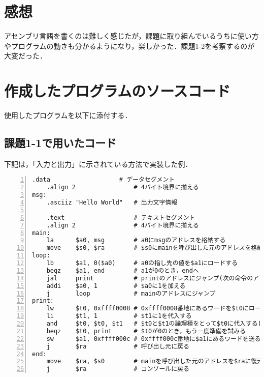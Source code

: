 \section{感想}
アセンブリ言語を書くのは難しく感じたが，課題に取り組んでいるうちに使い方やプログラムの動きも分かるようになり，楽しかった．課題1-2を考察するのが大変だった．

\section{作成したプログラムのソースコード} \label{sec:makep}

使用したプログラムを以下に添付する．



\subsection{課題1-1で用いたコード} \label{sec:p1-1}
下記は，「入力と出力」に示されている方法で実装した例．
\begin{Verbatim}[numbers=left, xleftmargin=10mm, numbersep=6pt,
                    fontsize=\small, baselinestretch=0.8]
    .data                   # データセグメント
    .align 2                # 4バイト境界に揃える
msg:
    .asciiz "Hello World"   # 出力文字情報

    .text                   # テキストセグメント
    .align 2                # 4バイト境界に揃える
main:
    la      $a0, msg        # a0にmsgのアドレスを格納する
    move    $s0, $ra        # $s0にmainを呼び出した元のアドレスを格納
loop:
    lb      $a1, 0($a0)     # a0の指し先の値を$a1にロードする
    beqz    $a1, end        # a1が0のとき，endへ
    jal     print           # printのアドレスにジャンプ(次の命令のアドレスを$raに)
    addi    $a0, 1          # $a0に1を加える
    j       loop            # mainのアドレスにジャンプ
print:
    lw      $t0, 0xffff0008 # 0xffff0008番地にあるワードを$t0にロードする
    li      $t1, 1          # $t1に1を代入する
    and     $t0, $t0, $t1   # $t0と$t1の論理積をとって$t0に代入する($t0が1か確認する)
    beqz    $t0, print      # $t0が0のとき，もう一度準備を試みる
    sw      $a1, 0xffff000c # 0xffff000c番地に$a1にあるワードを送る
    j       $ra             # 呼び出し元に戻る
end:
    move    $ra, $s0        # mainを呼び出した元のアドレスを$raに復元
    j       $ra             # コンソールに戻る
\end{Verbatim}

